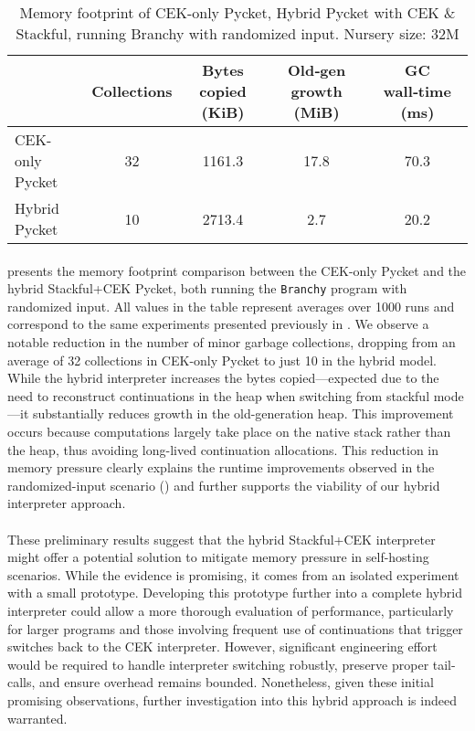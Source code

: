       \begin{table}[!h]
        \centering
        \small
        \begin{tabular}{lcccc}
          \toprule
          & Collections & Bytes copied (KiB) & Old‑gen growth (MiB) & GC wall‑time (ms)\\
          \midrule
          CEK-only Pycket        	& 32   & 1161.3 & 17.8  & 70.3\\
          Hybrid Pycket 				  & 10  &  2713.4 & 2.7 & 20.2\\
          \bottomrule
        \end{tabular}
        \caption{Memory footprint of CEK-only Pycket, Hybrid Pycket with CEK \& Stackful, running Branchy with randomized input. Nursery size: 32M}
        \label{table:memory-footprints-cek-vs-hybrid}
		  \end{table}

      \paragraph{}%
         presents the memory footprint comparison between the CEK-only Pycket and the hybrid Stackful+CEK Pycket, both running the \texttt{Branchy} program with randomized input. All values in the table represent averages over 1000 runs and correspond to the same experiments presented previously in . We observe a notable reduction in the number of minor garbage collections, dropping from an average of 32 collections in CEK-only Pycket to just 10 in the hybrid model. While the hybrid interpreter increases the bytes copied—expected due to the need to reconstruct continuations in the heap when switching from stackful mode—it substantially reduces growth in the old-generation heap. This improvement occurs because computations largely take place on the native stack rather than the heap, thus avoiding long-lived continuation allocations. This reduction in memory pressure clearly explains the runtime improvements observed in the randomized-input scenario () and further supports the viability of our hybrid interpreter approach.

      \paragraph{}%
        These preliminary results suggest that the hybrid Stackful+CEK interpreter might offer a potential solution to mitigate memory pressure in self-hosting scenarios. While the evidence is promising, it comes from an isolated experiment with a small prototype. Developing this prototype further into a complete hybrid interpreter could allow a more thorough evaluation of performance, particularly for larger programs and those involving frequent use of continuations that trigger switches back to the CEK interpreter. However, significant engineering effort would be required to handle interpreter switching robustly, preserve proper tail-calls, and ensure overhead remains bounded. Nonetheless, given these initial promising observations, further investigation into this hybrid approach is indeed warranted.

